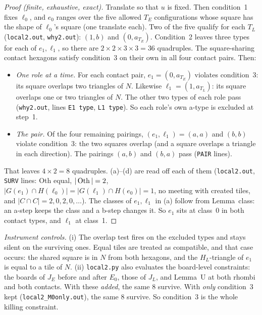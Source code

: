 \documentclass[11pt]{article}
\theoremstyle{definition}\newtheorem{definition}[theorem]{Definition}\newtheorem{remark}[theorem]{Remark}
\begin{document}
\begin{proof}[Proof (finite, exhaustive, exact)]
Translate so that $u$ is fixed. Then condition~1 fixes $\ell_0$, and $e_0$ ranges over the five allowed $T_E$ configurations whose square has the shape of $\ell_0$'s square (one translate each). Two of the five qualify for each $T_L$ (\texttt{local2.out}, \texttt{why2.out}): $(1,b)$ and $(0,a_{T_E})$. Condition~2 leaves three types for each of $e_1,\ell_1$, so there are $2\times2\times3\times3=36$ quadruples. The square-sharing contact hexagons satisfy condition~3 on their own in all four contact pairs. Then:
\begin{itemize}
\item \emph{One role at a time.} For each contact pair, $e_1=(0,a_{T_E})$ violates condition~3: its square overlaps two triangles of $N$. Likewise $\ell_1=(1,a_{T_L})$: its square overlaps one or two triangles of $N$. The other two types of each role pass (\texttt{why2.out}, lines \texttt{E1 type}, \texttt{L1 type}). So each role's own a-type is excluded at step~1.
\item \emph{The pair.} Of the four remaining pairings, $(e_1,\ell_1)=(a,a)$ and $(b,b)$ violate condition~3: the two squares overlap (and a square overlaps a triangle in each direction). The pairings $(a,b)$ and $(b,a)$ pass (\texttt{PAIR} lines).
\end{itemize}
That leaves $4\times2=8$ quadruples. (a)--(d) are read off each of them (\texttt{local2.out}, \texttt{SURV} lines: Oth equal, $|\operatorname{Oth}|=2$, $|G(e_1)\cap H(\ell_0)|=|G(\ell_1)\cap H(e_0)|=1$, no meeting with created tiles, and $|C\cap C|=2,0,2,0,\dots$). The classes of $e_1,\ell_1$ in (a) follow from Lemma~class: an a-step keeps the class and a b-step changes it. So $e_1$ sits at class~0 in both contact types, and $\ell_1$ at class~1.
\end{proof}
\noindent\emph{Instrument controls.} (i) The overlap test fires on the excluded types and stays silent on the surviving ones. Equal tiles are treated as compatible, and that case occurs: the shared square is in $N$ from both hexagons, and the $H_L$-triangle of $e_1$ is equal to a tile of $N$. (ii) \texttt{local2.py} also evaluates the board-level constraints: the boards of $J_E$ before and after $E_0$, those of $J_L$, and Lemma~U at both rhombi and both contacts. With these \emph{added}, the same 8 survive. With \emph{only} condition~3 kept (\texttt{local2\_M0only.out}), the same 8 survive. So condition~3 is the whole killing constraint.
\end{document}
